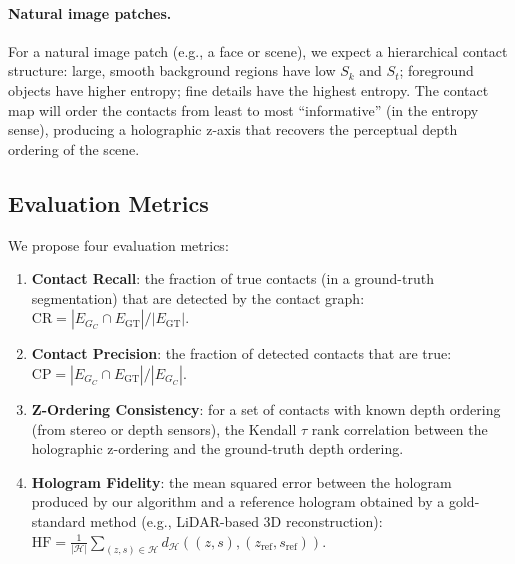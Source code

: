 \documentclass[twocolumn]{article}
\theoremstyle{plain}
\theoremstyle{definition}
\newcommand{\HH}{\mathcal{H}}
\newcommand{\Sk}{S_k}
\newcommand{\St}{S_t}
\begin{document}
\paragraph{Natural image patches.} For a natural image patch (e.g., a face or
scene), we expect a hierarchical contact structure: large, smooth background
regions have low $\Sk$ and $\St$; foreground objects have higher entropy; fine
details have the highest entropy. The contact map will order the contacts
from least to most ``informative'' (in the entropy sense), producing a holographic
z-axis that recovers the perceptual depth ordering of the scene.

\subsection{Evaluation Metrics}

We propose four evaluation metrics:

\begin{enumerate}[label=(\alph*)]
\item \textbf{Contact Recall}: the fraction of true contacts (in a ground-truth
  segmentation) that are detected by the contact graph:
  $\text{CR} = |E_{G_C} \cap E_{\text{GT}}| / |E_{\text{GT}}|$.

\item \textbf{Contact Precision}: the fraction of detected contacts that are true:
  $\text{CP} = |E_{G_C} \cap E_{\text{GT}}| / |E_{G_C}|$.

\item \textbf{Z-Ordering Consistency}: for a set of contacts with known depth ordering
  (from stereo or depth sensors), the Kendall $\tau$ rank correlation between
  the holographic z-ordering and the ground-truth depth ordering.

\item \textbf{Hologram Fidelity}: the mean squared error between the hologram
  produced by our algorithm and a reference hologram obtained by a gold-standard
  method (e.g., LiDAR-based 3D reconstruction):
  $\text{HF} = \frac{1}{|\HH|} \sum_{(z,s) \in \HH} d_{\HH}((z,s), (z_{\text{ref}},s_{\text{ref}}))$.
\end{enumerate}
\end{document}
